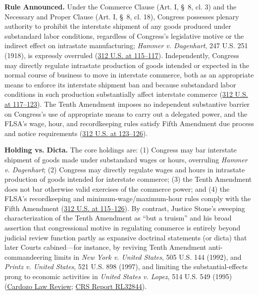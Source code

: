\documentclass[12pt]{article}
\begin{document}
\textbf{Rule Announced.} Under the Commerce Clause (Art. I, \S~8, cl. 3) and the Necessary and Proper Clause (Art. I, \S~8, cl. 18), Congress possesses plenary authority to prohibit the interstate shipment of any goods produced under substandard labor conditions, regardless of Congress's legislative motive or the indirect effect on intrastate manufacturing; \textit{Hammer v. Dagenhart}, 247 U.S. 251 (1918), is expressly overruled (\href{https://supreme.justia.com/cases/federal/us/312/100/}{312 U.S. at 115--117}). Independently, Congress may directly regulate intrastate production of goods intended or expected in the normal course of business to move in interstate commerce, both as an appropriate means to enforce its interstate shipment ban and because substandard labor conditions in such production substantially affect interstate commerce (\href{https://supreme.justia.com/cases/federal/us/312/100/}{312 U.S. at 117--123}). The Tenth Amendment imposes no independent substantive barrier on Congress's use of appropriate means to carry out a delegated power, and the FLSA's wage, hour, and recordkeeping rules satisfy Fifth Amendment due process and notice requirements (\href{https://supreme.justia.com/cases/federal/us/312/100/}{312 U.S. at 123--126}).

\textbf{Holding vs. Dicta.} The core holdings are: (1) Congress may bar interstate shipment of goods made under substandard wages or hours, overruling \textit{Hammer v. Dagenhart}; (2) Congress may directly regulate wages and hours in intrastate production of goods intended for interstate commerce; (3) the Tenth Amendment does not bar otherwise valid exercises of the commerce power; and (4) the FLSA's recordkeeping and minimum-wage/maximum-hour rules comply with the Fifth Amendment (\href{https://supreme.justia.com/cases/federal/us/312/100/}{312 U.S. at 115--126}). By contrast, Justice Stone's sweeping characterization of the Tenth Amendment as ``but a truism'' and his broad assertion that congressional motive in regulating commerce is entirely beyond judicial review function partly as expansive doctrinal statements (or dicta) that later Courts cabined---for instance, by reviving Tenth Amendment anti-commandeering limits in \textit{New York v. United States}, 505 U.S. 144 (1992), and \textit{Printz v. United States}, 521 U.S. 898 (1997), and limiting the substantial-effects prong to economic activities in \textit{United States v. Lopez}, 514 U.S. 549 (1995) (\href{https://www.cardozolawreview.com/popular-sovereignty-tenth-amendment-reese/}{Cardozo Law Review}; \href{https://www.everycrsreport.com/reports/RL32844.html}{CRS Report RL32844}).
\end{document}
